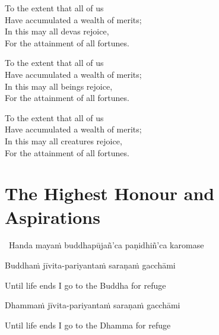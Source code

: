 \ifafiveversion\clearpage\fi

\begin{english-verses}
  To the extent that all of us\\
  Have accumulated a wealth of merits;\\
  In this may all devas rejoice,\\
  For the attainment of all fortunes.
\end{english-verses}

\begin{english-verses}
  To the extent that all of us\\
  Have accumulated a wealth of merits;\\
\ifninebythirteenversion\clearpage\fi
  In this may all beings rejoice,\\
  For the attainment of all fortunes.
\end{english-verses}

\begin{english-verses}
  To the extent that all of us\\
  Have accumulated a wealth of merits;\\
  \ifbfiveversion\clearpage\fi
  In this may all creatures rejoice,\\
  For the attainment of all fortunes.
\end{english-verses}

\suttaRef{[MJG]}



\section{The Highest Honour and Aspirations}
\label{highest-honour-aspirations}

\begin{leader}
  \anglebracketleft\ \hspace{-0.5mm}Handa mayaṁ buddhapūjañ'ca paṇidhiñ'ca karomase \hspace{-0.5mm}\anglebracketright\
\end{leader}

Buddhaṁ jīvita-pariyantaṁ saraṇaṁ gacchāmi

\begin{english}
  Until life ends I go to the Buddha for refuge
\end{english}

Dhammaṁ jīvita-pariyantaṁ saraṇaṁ gacchāmi

\begin{english}
  Until life ends I go to the Dhamma for refuge
\end{english}

